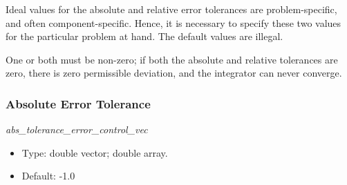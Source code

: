 Ideal values for the absolute and relative error tolerances are
problem-specific, and often component-specific.  Hence, it is necessary to
specify these two values for the particular problem at hand.  The default
values are illegal.

One or both must
be non-zero; if both the absolute and relative tolerances are zero, there
is zero permissible deviation, and the integrator can never
converge.

\subsubsection{Absolute Error Tolerance}
\textit{abs\_tolerance\_error\_control\_vec}

\begin{itemize}
\item Type:  double vector; double array.
\item Default: -1.0
\end{itemize}

